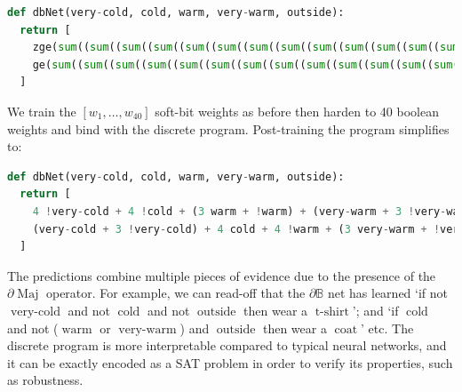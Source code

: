 \documentclass{article} %
\begin{document}
\begin{lstlisting}[language=Python,style=mystyle,frame=single]
def dbNet(very-cold, cold, warm, very-warm, outside):
  return [
    zge(sum((sum((sum((sum((sum((sum((sum((sum((sum((sum((sum((sum((sum((sum((sum((sum((sum((sum((sum((sum((0, not(xor(ne(very-cold, 0), w1)))), not(xor(ne(cold, 0), w2)))), not(xor(ne(warm, 0), w3)))), not(xor(ne(very-warm, 0), w4)))), not(xor(ne(outside, 0), w5)))), not(xor(ne(very-cold, 0), w6)))), not(xor(ne(cold, 0), w7)))), not(xor(ne(warm, 0), w8)))), not(xor(ne(very-warm, 0), w9)))), not(xor(ne(outside, 0), w10)))), not(xor(ne(very-cold, 0), w11)))), not(xor(ne(cold, 0), w12)))), not(xor(ne(warm, 0), w13)))), not(xor(ne(very-warm, 0), w14)))), not(xor(ne(outside, 0), w15)))), not(xor(ne(very-cold, 0), w16)))), not(xor(ne(cold, 0), w17)))), not(xor(ne(warm, 0), w18)))), not(xor(ne(very-warm, 0), w19)))), not(xor(ne(outside, 0), w20)))), 11),
    ge(sum((sum((sum((sum((sum((sum((sum((sum((sum((sum((sum((sum((sum((sum((sum((sum((sum((sum((sum((sum((0, not(xor(ne(very-cold, 0), w21)))), not(xor(ne(cold, 0), w22)))), not(xor(ne(warm, 0), w23)))), not(xor(ne(very-warm, 0), w24)))), not(xor(ne(outside, 0), w25)))), not(xor(ne(very-cold, 0), w26)))), not(xor(ne(cold, 0), w27)))), not(xor(ne(warm, 0), w28)))), not(xor(ne(very-warm, 0), w29)))), not(xor(ne(outside, 0), w30)))), not(xor(ne(very-cold, 0), w31)))), not(xor(ne(cold, 0), w32)))), not(xor(ne(warm, 0), w33)))), not(xor(ne(very-warm, 0), w34)))), not(xor(ne(outside, 0), w35)))), not(xor(ne(very-cold, 0), w36)))), not(xor(ne(cold, 0), w37)))), not(xor(ne(warm, 0), w38)))), not(xor(ne(very-warm, 0), w39)))), not(xor(ne(outside, 0), w40)))), 11)
  ]
\end{lstlisting}
We train the $[w_{1}, \dots, w_{40}]$ soft-bit weights as before then harden to 40 boolean weights and bind with the discrete program. Post-training the program simplifies to:

\begin{lstlisting}[language=Python,style=mystyle,frame=single]
def dbNet(very-cold, cold, warm, very-warm, outside):
  return [
    4 !very-cold + 4 !cold + (3 warm + !warm) + (very-warm + 3 !very-warm) + (outside + 3 !outside) >= 11,
    (very-cold + 3 !very-cold) + 4 cold + 4 !warm + (3 very-warm + !very-warm) + 2 (outside + !outside) >= 11
  ]
\end{lstlisting}

The predictions combine multiple pieces of evidence due to the presence of the $\partial\!\operatorname{Maj}$ operator. For example, we can read-off that the $\partial\mathbb{B}$ net has learned `if not $\operatorname{very-cold}$ and not $\operatorname{cold}$ and not $\operatorname{outside}$ then wear a $\operatorname{t-shirt}$'; and `if $\operatorname{cold}$ and not ($\operatorname{warm}$ or $\operatorname{very-warm}$) and $\operatorname{outside}$ then wear a $\operatorname{coat}$' etc. The discrete program is more interpretable compared to typical neural networks, and it can be exactly encoded as a SAT problem in order to verify its properties, such as robustness.
\end{document}
